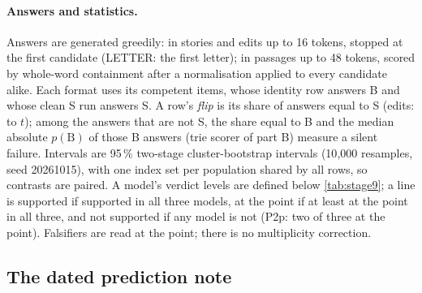 \paragraph{Answers and statistics.} Answers are generated greedily: in stories and edits up to 16 tokens, stopped at the first candidate (LETTER: the first letter); in passages up to 48 tokens, scored by whole-word containment after a normalisation applied to every candidate alike. Each format uses its competent items, whose identity row answers B and whose clean S run answers S. A row's \emph{flip} is its share of answers equal to S (edits: to $t$); among the answers that are not S, the share equal to B and the median absolute $p(\mathrm{B})$ of those B answers (trie scorer of part B) measure a silent failure. Intervals are 95\,\% two-stage cluster-bootstrap intervals (10{,}000 resamples, seed 20261015), with one index set per population shared by all rows, so contrasts are paired. A model's verdict levels are defined below \cref{tab:stage9}; a line is supported if supported in all three models, at the point if at least at the point in all three, and not supported if any model is not (P2p: two of three at the point). Falsifiers are read at the point; there is no multiplicity correction.

\subsection{The dated prediction note}\label{app:s9-note}

\begin{table}[!htbp]
\centering
\caption{\textbf{Stage 9: every prediction and falsifier of the dated note, with its verdict.} The verdict column combines the three models; under a model's verdict that is not \emph{supported}, the decisive cell as the scorer prints it. The note's wording is shortened; \cref{app:s9-note} adds the conditions the table omits.}
\label{tab:stage9}
\end{table}

